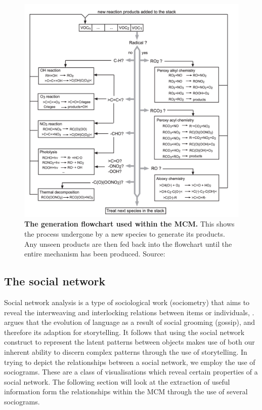 \begin{figure}[H]
     \centering
         \centering
         \includegraphics[width=.96\textwidth]{figures_c1/generation.png}
         \caption{\textbf{The generation flowchart used within the MCM.} This shows the process undergone by a new species to generate its products. Any unseen products are then fed back into the flowchart until the entire mechanism has been produced.  Source:\cite{protocol}}
         \label{fig:protocol}
     \end{figure}


\subsection{The social network}
Social network analysis is a type of sociological work (sociometry) that aims to reveal the interweaving and interlocking relations between items or individuals, \cite{socialorigin}. \cite{gossip} argues that the evolution of language as a result of social grooming (gossip), and therefore its adaption for storytelling. It follows that using the social network construct to represent the latent patterns between objects makes use of both our inherent ability to discern complex patterns through the use of storytelling. In trying to depict the relationships between a social network, we employ the use of sociograms. These are a class of visualisations which reveal certain properties of a social network. The following section will look at the extraction of useful information form the relationships within the MCM through the use of several sociograms. 

